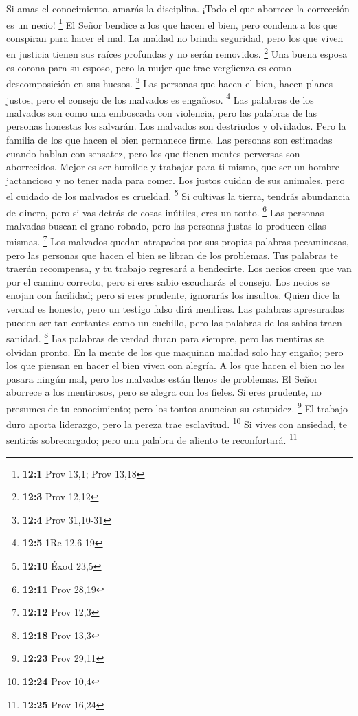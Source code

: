  Si amas el conocimiento, amarás la disciplina. ¡Todo el
que aborrece la corrección es un necio! \footnote{\textbf{12:1} Prov
  13,1; Prov 13,18}  El Señor bendice a los que hacen el
bien, pero condena a los que conspiran para hacer el mal. 
La maldad no brinda seguridad, pero los que viven en justicia tienen sus
raíces profundas y no serán removidos. \footnote{\textbf{12:3} Prov
  12,12}  Una buena esposa es corona para su esposo, pero
la mujer que trae vergüenza es como descomposición en sus huesos.
\footnote{\textbf{12:4} Prov 31,10-31}  Las personas que
hacen el bien, hacen planes justos, pero el consejo de los malvados es
engañoso. \footnote{\textbf{12:5} 1Re 12,6-19}  Las
palabras de los malvados son como una emboscada con violencia, pero las
palabras de las personas honestas los salvarán.  Los
malvados son destriudos y olvidados. Pero la familia de los que hacen el
bien permanece firme.  Las personas son estimadas cuando
hablan con sensatez, pero los que tienen mentes perversas son
aborrecidos.  Mejor es ser humilde y trabajar para ti
mismo, que ser un hombre jactancioso y no tener nada para comer.
 Los justos cuidan de sus animales, pero el cuidado de
los malvados es crueldad. \footnote{\textbf{12:10} Éxod 23,5}
 Si cultivas la tierra, tendrás abundancia de dinero,
pero si vas detrás de cosas inútiles, eres un tonto. \footnote{\textbf{12:11}
  Prov 28,19}  Las personas malvadas buscan el grano
robado, pero las personas justas lo producen ellas mismas. \footnote{\textbf{12:12}
  Prov 12,3}  Los malvados quedan atrapados por sus
propias palabras pecaminosas, pero las personas que hacen el bien se
libran de los problemas.  Tus palabras te traerán
recompensa, y tu trabajo regresará a bendecirte.  Los
necios creen que van por el camino correcto, pero si eres sabio
escucharás el consejo.  Los necios se enojan con
facilidad; pero si eres prudente, ignorarás los insultos.
 Quien dice la verdad es honesto, pero un testigo falso
dirá mentiras.  Las palabras apresuradas pueden ser tan
cortantes como un cuchillo, pero las palabras de los sabios traen
sanidad. \footnote{\textbf{12:18} Prov 13,3}  Las
palabras de verdad duran para siempre, pero las mentiras se olvidan
pronto.  En la mente de los que maquinan maldad solo hay
engaño; pero los que piensan en hacer el bien viven con alegría.
 A los que hacen el bien no les pasara ningún mal, pero
los malvados están llenos de problemas.  El Señor
aborrece a los mentirosos, pero se alegra con los fieles.
 Si eres prudente, no presumes de tu conocimiento; pero
los tontos anuncian su estupidez. \footnote{\textbf{12:23} Prov 29,11}
 El trabajo duro aporta liderazgo, pero la pereza trae
esclavitud. \footnote{\textbf{12:24} Prov 10,4}  Si vives
con ansiedad, te sentirás sobrecargado; pero una palabra de aliento te
reconfortará. \footnote{\textbf{12:25} Prov 16,24}

